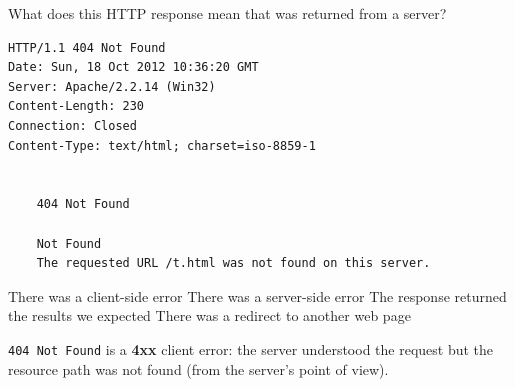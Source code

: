 \question[4]
What does this HTTP response mean that was returned from a server?
\begin{lstlisting}[style=http]
HTTP/1.1 404 Not Found
Date: Sun, 18 Oct 2012 10:36:20 GMT
Server: Apache/2.2.14 (Win32)
Content-Length: 230
Connection: Closed
Content-Type: text/html; charset=iso-8859-1


    404 Not Found

    Not Found
    The requested URL /t.html was not found on this server.
\end{lstlisting}
\begin{choices}
  \CorrectChoice There was a client-side error
  \choice There was a server-side error
  \choice The response returned the results we expected
  \choice There was a redirect to another web page
\end{choices}
\begin{solution}
  \texttt{404 Not Found} is a \textbf{4xx} client error: the server understood the request but the resource path was not found (from the server's point of view).
\end{solution}

\newpage


